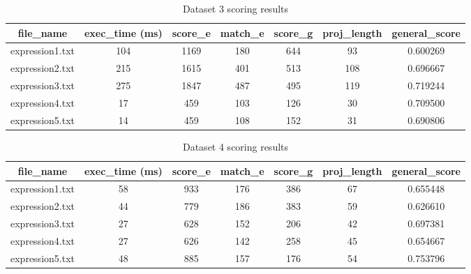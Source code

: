 \documentclass[12pt,a4paper]{article}
\begin{document}
\begin{table}[H]
	\begin{center}
		\caption{Dataset 3 scoring results}
		\begin{tabular}{|c|c|c|c|c|c|c|}
			\hline
			\textbf{file\_name} & \textbf{exec\_time} (ms) & \textbf{score\_e} & \textbf{match\_e} & \textbf{score\_g} & \textbf{proj\_length} & \textbf{general\_score} \\
			\hline\hline
			expression1.txt & 104 & 1169 & 180 & 644 & 93  & 0.600269 \\
			\hline
			expression2.txt & 215 & 1615 & 401 & 513 & 108 & 0.696667 \\
			\hline
			expression3.txt & 275 & 1847 & 487 & 495 & 119 & 0.719244 \\
			\hline
			expression4.txt & 17  & 459  & 103 & 126 & 30  & 0.709500 \\
			\hline
			expression5.txt & 14  & 459  & 108 & 152 & 31  & 0.690806 \\
			\hline
		\end{tabular}
	\end{center}
\end{table}

\begin{table}[H]
	\begin{center}
		\caption{Dataset 4 scoring results}
		\begin{tabular}{|c|c|c|c|c|c|c|}
			\hline
			\textbf{file\_name} & \textbf{exec\_time} (ms) & \textbf{score\_e} & \textbf{match\_e} & \textbf{score\_g} & \textbf{proj\_length} & \textbf{general\_score} \\
			\hline\hline
			expression1.txt & 58 & 933 & 176 & 386 & 67 & 0.655448 \\
			\hline
			expression2.txt & 44 & 779 & 186 & 383 & 59 & 0.626610 \\
			\hline
			expression3.txt & 27 & 628 & 152 & 206 & 42 & 0.697381 \\
			\hline
			expression4.txt & 27 & 626 & 142 & 258 & 45 & 0.654667 \\
			\hline
			expression5.txt & 48 & 885 & 157 & 176 & 54 & 0.753796 \\
			\hline
		\end{tabular}
	\end{center}
\end{table}


\pagebreak
\end{document}
